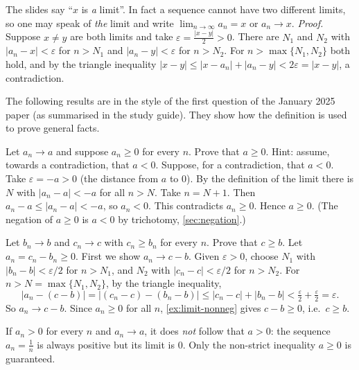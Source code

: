 \begin{external}
The slides say ``$x$ is \emph{a} limit''. In fact a sequence cannot have two different limits, so one may speak of
\emph{the} limit and write $\lim_{n\to\infty}a_n=x$ or $a_n\to x$. \emph{Proof.} Suppose $x\ne y$ are both limits and take
$\varepsilon=\frac{|x-y|}{2}>0$. There are $N_1$ and $N_2$ with $|a_n-x|<\varepsilon$ for $n>N_1$ and $|a_n-y|<\varepsilon$ for $n>N_2$. For
$n>\max\{N_1,N_2\}$ both hold, and by the triangle inequality $|x-y|\le|x-a_n|+|a_n-y|<2\varepsilon=|x-y|$, a contradiction.
\end{external}

The following results are in the style of the first question of the January 2025 paper (as summarised in the study guide).
They show how the definition is used to prove general facts.

\begin{example}
Let $a_n\to a$ and suppose $a_n\ge0$ for every $n$. Prove that $a\ge0$. Hint: assume, towards a contradiction, that $a<0$.
\solution
Suppose, for a contradiction, that $a<0$. Take $\varepsilon=-a>0$ (the distance from $a$ to $0$). By the definition of the limit there
is $N$ with $|a_n-a|<-a$ for all $n>N$. Take $n=N+1$. Then $a_n-a\le|a_n-a|<-a$, so $a_n<0$. This contradicts $a_n\ge0$. Hence
$a\ge0$. (The negation of $a\ge0$ is $a<0$ by trichotomy, \cref{sec:negation}.)
\end{example}

\begin{example}
Let $b_n\to b$ and $c_n\to c$ with $c_n\ge b_n$ for every $n$. Prove that $c\ge b$. 
\solution
Let $a_n=c_n-b_n\ge0$. First we show $a_n\to c-b$. Given $\varepsilon>0$, choose $N_1$ with $|b_n-b|<\varepsilon/2$ for $n>N_1$, and $N_2$
with $|c_n-c|<\varepsilon/2$ for $n>N_2$. For $n>N=\max\{N_1,N_2\}$, by the triangle inequality,
\[
|a_n-(c-b)|=|(c_n-c)-(b_n-b)|\le|c_n-c|+|b_n-b|<\tfrac\varepsilon2+\tfrac\varepsilon2=\varepsilon.
\]
So $a_n\to c-b$. Since $a_n\ge0$ for all $n$, \cref{ex:limit-nonneg} gives $c-b\ge0$, i.e.\ $c\ge b$.
\end{example}

\begin{warning}
If $a_n>0$ for every $n$ and $a_n\to a$, it does \emph{not} follow that $a>0$: the sequence $a_n=\frac1n$ is always positive
but its limit is $0$. Only the non-strict inequality $a\ge0$ is guaranteed.
\end{warning}

